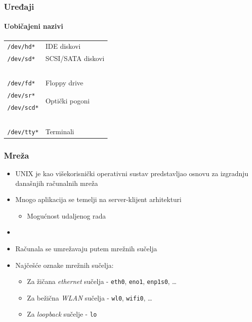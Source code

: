 \documentclass[table,usenames,dvipsnames]{beamer}
\newcommand{\shell}[1]{\texttt{#1}}
\begin{document}
\begin{frame}[t]
	\frametitle{Uređaji}
	\framesubtitle{Uobičajeni nazivi}
	\begin{tabular}{l l}
		\shell{/dev/hd*} & IDE diskovi\\
		\shell{/dev/sd*} & SCSI/SATA diskovi\\
		\,\\
		\shell{/dev/fd*} & Floppy drive\\
		\shell{/dev/sr*} & \multirow{2}{*}{Optički pogoni}\\
		\shell{/dev/scd*} & \\
		\,\\
		\shell{/dev/tty*} & Terminali
	\end{tabular}
\end{frame}

\begin{frame}[t]
	\frametitle{Mreža}
	\begin{itemize}
		\item UNIX je kao višekorisnički operativni sustav predstavljao osnovu za izgradnju današnjih računalnih mreža
		\item Mnogo aplikacija se temelji na server-klijent arhitekturi
		\begin{itemize}
			\item Mogućnost udaljenog rada
		\end{itemize}
		\item[]
		\item Računala se umrežavaju putem mrežnih sučelja
		\item Najčešće oznake mrežnih sučelja:
		\begin{itemize}
			\item Za žičana \emph{ethernet} sučelja - \shell{eth0}, \shell{eno1}, \shell{enp1s0}, \ldots
			\item Za bežična \emph{WLAN} sučelja - \shell{wl0}, \shell{wifi0}, \ldots
			\item Za \emph{loopback} sučelje - \shell{lo}
		\end{itemize}
	\end{itemize}
\end{frame}
\end{document}
